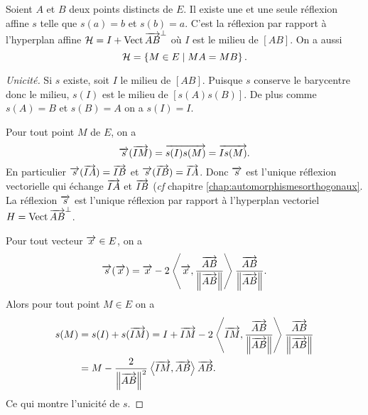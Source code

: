 \begin{prop}
  Soient $A$ et $B$ deux points distincts de $E$. Il existe une et une seule réflexion affine $s$ telle que $s(a)=b$ et $s(b)=a$. C'est la réflexion par rapport à l'hyperplan affine $\mathcal{H}=I +\operatorname{Vect}{\overrightarrow{AB}}^\perp$ où $I$ est le milieu de $[AB]$. On a aussi
  \begin{equation}
    \mathcal{H} = \left\{M \in E\mathrel{}\middle|\mathrel{}MA=MB\right\}.
  \end{equation}
\end{prop}
\begin{proof}[Unicité]
  Si $s$ existe, soit $I$ le milieu de $[AB]$. Puisque $s$ conserve le barycentre donc le milieu, $s(I)$ est le milieu de $[s(A)s(B)]$. De plus comme $s(A)=B$ et $s(B)=A$ on a $s(I)=I$. 

  Pour tout point $M$ de $E$, on a
  \begin{equation}
    \overrightarrow{s}(\overrightarrow{IM}) = \overrightarrow{s(I)s(M)} = \overrightarrow{Is(M)}.
  \end{equation}
  En particulier $\overrightarrow{s}(\overrightarrow{IA})=\overrightarrow{IB}$ et $\overrightarrow{s}(\overrightarrow{IB})=\overrightarrow{IA}$. Donc $\overrightarrow{s}$ est l'unique réflexion vectorielle qui échange $\overrightarrow{IA}$ et $\overrightarrow{IB}$ (\emph{cf} chapitre \ref{chap:automorphismesorthogonaux}. La réflexion $\overrightarrow{s}$ est l'unique réflexion par rapport à l'hyperplan vectoriel $H = \operatorname{Vect}{\overrightarrow{AB}}^\perp$.

  Pour tout vecteur $\overrightarrow{x} \in E$, on a
  \begin{equation}
    \overrightarrow{s}(\overrightarrow{x}) = \overrightarrow{x} - 2\left\langle{\overrightarrow{x}},{\frac{\overrightarrow{AB}}{\left\lVert\overrightarrow{AB}\right\rVert}}\right\rangle \frac{\overrightarrow{AB}}{\left\lVert\overrightarrow{AB}\right\rVert}.
  \end{equation}
  Alors pour tout point $M \in E$ on a
  \begin{align}
    s(M) &= s(I) + s(\overrightarrow{IM}) = I + \overrightarrow{IM} -2\left\langle{\overrightarrow{IM}},{\frac{\overrightarrow{AB}}{\left\lVert\overrightarrow{AB}\right\rVert}}\right\rangle \frac{\overrightarrow{AB}}{\left\lVert\overrightarrow{AB}\right\rVert} \\
        &=M -\frac{2}{\left\lVert\overrightarrow{AB}\right\rVert^2}\left\langle{\overrightarrow{IM}},{\overrightarrow{AB}}\right\rangle \overrightarrow{AB}.
  \end{align}
  Ce qui montre l'unicité de $s$.
\end{proof}
